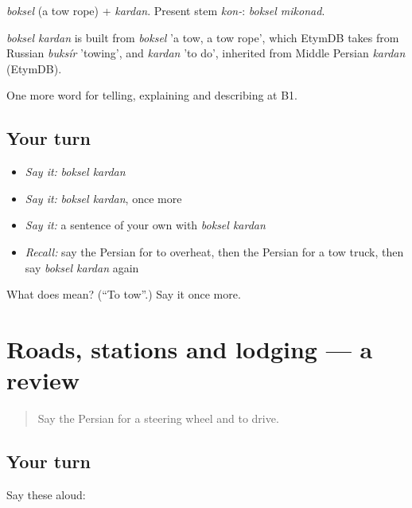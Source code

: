 \emph{boksel} (a tow rope) + \emph{kardan}. Present stem \emph{kon-}: \emph{boksel mikonad}.

\begin{cousinweb}
\emph{boksel kardan} is built from \emph{boksel} 'a tow, a tow rope', which EtymDB takes from Russian \emph{buksír} 'towing', and \emph{kardan} 'to do', inherited from Middle Persian \emph{kardan} (EtymDB).
\end{cousinweb}

\begin{grammarlens}[title={What you've built}]
One more word for telling, explaining and describing at B1.
\end{grammarlens}

\subsection*{Your turn}
\begin{itemize}
\raggedright
  \item \emph{Say it:} \emph{boksel kardan}
  \item \emph{Say it:} \emph{boksel kardan}, once more
  \item \emph{Say it:} a sentence of your own with \emph{boksel kardan}
  \item \emph{Recall:} say the Persian for to overheat, then the Persian for a tow truck, then say \emph{boksel kardan} again
\end{itemize}

\begin{tcolorbox}[breakable,colback=teal!4,colframe=teal!35!black,title={Before you move on}]
What does   mean? (\textquotedblleft{}To tow\textquotedblright{}.) Say it once more.
\end{tcolorbox}
\section[(dialogue)]{Roads, stations and lodging — a review}

\label{lesson:FA-R427-review-420-427}



\begin{quote}
Say the Persian for a steering wheel and to drive.
\end{quote}

\subsection*{Your turn}
Say these aloud:

